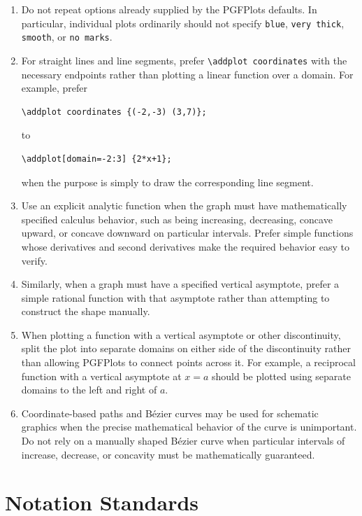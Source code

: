 \documentclass[document,notitlepage]{mhdocument}
\begin{document}
\begin{enumerate}[resume]
\item Do not repeat options already supplied by the PGFPlots defaults. In
particular, individual plots ordinarily should not specify \texttt{blue},
\texttt{very thick}, \texttt{smooth}, or \texttt{no marks}.

\item For straight lines and line segments, prefer
\verb|\addplot coordinates| with the necessary endpoints rather than plotting
a linear function over a domain. For example, prefer
\begin{verbatim}
\addplot coordinates {(-2,-3) (3,7)};
\end{verbatim}
to
\begin{verbatim}
\addplot[domain=-2:3] {2*x+1};
\end{verbatim}
when the purpose is simply to draw the corresponding line segment.

\item Use an explicit analytic function when the graph must have mathematically
specified calculus behavior, such as being increasing, decreasing, concave
upward, or concave downward on particular intervals. Prefer simple functions
whose derivatives and second derivatives make the required behavior easy to
verify.

\item Similarly, when a graph must have a specified vertical asymptote, prefer
a simple rational function with that asymptote rather than attempting to
construct the shape manually.

\item When plotting a function with a vertical asymptote or other discontinuity,
split the plot into separate domains on either side of the discontinuity rather
than allowing PGFPlots to connect points across it. For example, a reciprocal
function with a vertical asymptote at \(x=a\) should be plotted using separate
domains to the left and right of \(a\).

\item Coordinate-based paths and B\'ezier curves may be used for schematic
graphics when the precise mathematical behavior of the curve is unimportant.
Do not rely on a manually shaped B\'ezier curve when particular intervals of
increase, decrease, or concavity must be mathematically guaranteed.
\end{enumerate}

\section{Notation Standards}
\end{document}
